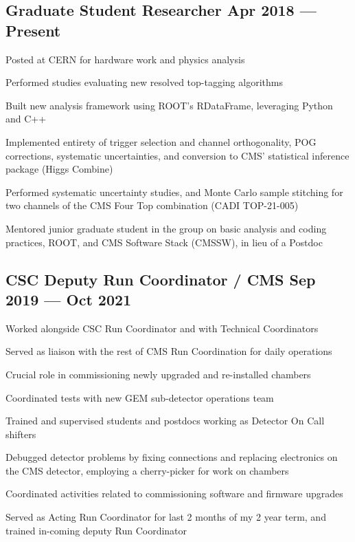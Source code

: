 \documentclass[letter,10pt]{article}
\begin{document}
\subsection{{Graduate Student Researcher \hfill Apr 2018 --- Present}}
\begin{zitemize}
\item Posted at CERN for hardware work and physics analysis
\item Performed studies evaluating new resolved top-tagging algorithms
\item Built new analysis framework using ROOT's RDataFrame, leveraging Python and C++
\item Implemented entirety of trigger selection and channel orthogonality, POG corrections, systematic uncertainties, and conversion to CMS' statistical inference package (Higgs Combine)
\item Performed systematic uncertainty studies, and Monte Carlo sample stitching for two channels of the CMS Four Top combination (CADI TOP-21-005)
\item Mentored junior graduate student in the group on basic analysis and coding practices, ROOT, and CMS Software Stack (CMSSW), in lieu of a Postdoc
\end{zitemize}

\subsection{{CSC Deputy Run Coordinator / CMS \hfill Sep 2019 --- Oct 2021}}
\begin{zitemize}
\item Worked alongside CSC Run Coordinator and with Technical Coordinators
\item Served as liaison with the rest of CMS Run Coordination for daily operations
\item Crucial role in commissioning newly upgraded and re-installed chambers
\item Coordinated tests with new GEM sub-detector operations team
\item Trained and supervised students and postdocs working as Detector On Call shifters
\item Debugged detector problems by fixing connections and replacing electronics on the CMS detector, employing a cherry-picker for work on chambers
\item Coordinated activities related to commissioning software and firmware upgrades
\item Served as Acting Run Coordinator for last 2 months of my 2 year term, and trained in-coming deputy Run Coordinator
\end{zitemize}
\end{document}
